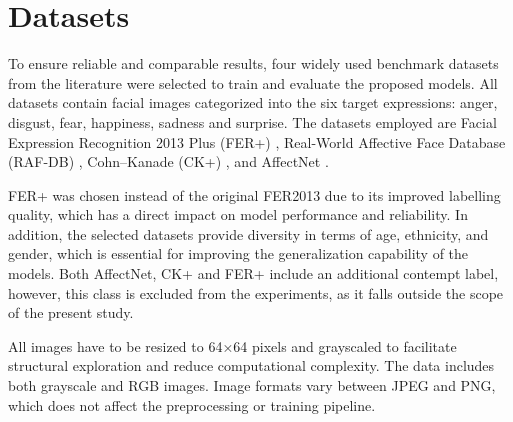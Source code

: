 \section{Datasets}
\label{sec:datasets}

To ensure reliable and comparable results, four widely used benchmark datasets from the literature were selected to train 
and evaluate the proposed models. All datasets contain facial images categorized into the six target expressions:
anger, disgust, fear, happiness, sadness and surprise. The datasets employed are Facial Expression Recognition 2013 Plus
(FER+) \cite{deep_network_fer}, Real-World Affective Face Database (RAF-DB) \cite{Li_2017_CVPR},
Cohn–Kanade (CK+) \cite{CK_dataset}, and 
AffectNet \cite{8013713}.

FER+ was chosen instead of the original FER2013 due to its improved labelling quality, which has a direct impact on 
model performance and reliability. In addition, the selected datasets provide diversity in terms of age, ethnicity, and gender,
which is essential for improving the generalization capability of the models. Both AffectNet, CK+ and FER+ include an 
additional contempt label, however, this class is excluded from the experiments, as it falls outside the scope of the 
present study.

All images have to be resized to 64×64 pixels and grayscaled to facilitate structural exploration and reduce computational complexity. 
The data includes both grayscale and RGB images. Image formats vary between JPEG and PNG, which does not affect the preprocessing
or training pipeline.


\begin{table}
  \centering
 \caption{Characteristics from Datasets}
\label{tab:dataset_characteristics}
\end{table}


